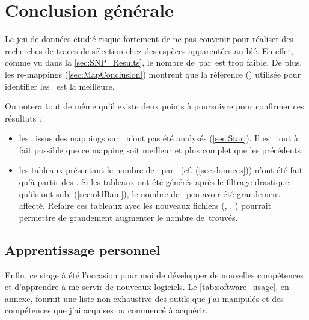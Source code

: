 \documentclass[../main]{subfiles} %
\begin{document}
\addto\extrasfrench{\protected\edef:{\unexpanded\expandafter{:}}}

\section{Conclusion générale}

Le jeu de données étudié risque fortement de ne pas convenir pour réaliser des recherches de traces de sélection chez des espèces apparentées au blé. En effet, comme vu dans la \cref{sec:SNP_Results}, le nombre de \SNP\,par \contig\,est trop faible. De plus, les re-\glspl{mapping} (\cref{sec:MapConclusion}) montrent que la référence (\TrEx) utilisée pour identifier les \SNP est la meilleure. 

On notera tout de même qu'il existe deux points à poursuivre pour confirmer ces résultats :

\begin{itemize}
    \item les \bam issus des \glspl{mapping} sur \GeMo n'ont pas été analysés (\cref{sec:Star}). Il est tout à fait possible que ce \gls{mapping} soit meilleur et plus complet que les précédents.

    \item les tableaux présentant le nombre de \SNP par \contig (cf. (\cref{sec:donnees})) n'ont été fait qu'à partir des \OldBam. Si les tableaux ont été générés après le filtrage drastique qu'ils ont subi (\cref{sec:oldBam}), le nombre de \SNP peu avoir été grandement affecté. Refaire ces tableaux avec les nouveaux fichiers (\BamGeStar, \BamTrEx, \BamTrMo) pourrait permettre de grandement augmenter le nombre de \SNP\,trouvés.
\end{itemize}

\subsection{Apprentissage personnel}
Enfin, ce stage à été l'occasion pour moi de développer de nouvelles compétences et d'apprendre à me servir de nouveaux logiciels. Le \cref{tab:software_usage}, en annexe, fournit une liste non exhaustive des outils que j'ai manipulés et des compétences que j'ai acquises ou commencé à acquérir.






\end{document}
